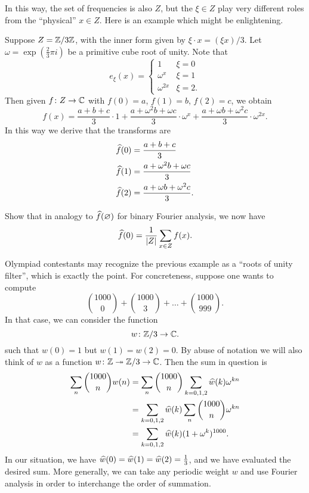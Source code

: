 In this way, the set of frequencies is also $Z$,
but the $\xi \in Z$ play very different roles from the ``physical'' $x \in Z$.
Here is an example which might be enlightening.
\begin{example}
	Suppose $Z = \mathbb Z/3\mathbb Z$, with the inner form given by $\xi \cdot x = (\xi x)/3$.
	Let $\omega = \exp(\frac 23 \pi i)$ be a primitive cube root of unity.
	Note that
	\[ e_\xi(x) = \begin{cases}
			1 & \xi = 0 \\
			\omega^x & \xi = 1 \\
			\omega^{2x} & \xi = 2.
		\end{cases} \]
	Then given $f \colon Z \to \mathbb C$ with $f(0) = a$, $f(1) = b$, $f(2) = c$,
	we obtain
	\[ f(x) = \frac{a+b+c}{3} \cdot 1
		+ \frac{a + \omega^2 b + \omega c}{3} \cdot \omega^x
		+ \frac{a + \omega b + \omega^2 c}{3} \cdot \omega^{2x}.  \]
	In this way we derive that the transforms are
	\begin{align*}
		\widehat f(0) &= \frac{a+b+c}{3} \\
		\widehat f(1) &= \frac{a+\omega^2 b+ \omega c}{3} \\
		\widehat f(2) &= \frac{a+\omega b+\omega^2c}{3}.
	\end{align*}
\end{example}
\begin{exercise}
	Show that in analogy to $\widehat f(\varnothing)$
	for binary Fourier analysis, we now have
	\[ \widehat f(0) = \frac{1}{|Z|} \sum_{x \in Z} f(x). \]
\end{exercise}
Olympiad contestants may recognize the previous example
as a ``roots of unity filter'', which is exactly the point.
For concreteness, suppose one wants to compute
\[ \binom{1000}{0} + \binom{1000}{3} + \dots + \binom{1000}{999}. \]
In that case, we can consider the function
\[ w \colon \mathbb Z/3 \to \mathbb C. \]
such that $w(0) = 1$ but $w(1) = w(2) = 0$.
By abuse of notation we will also think of $w$
as a function $w \colon \mathbb Z \twoheadrightarrow \mathbb Z/3 \to \mathbb C$.
Then the sum in question is
\begin{align*}
	\sum_n \binom{1000}{n} w(n)
	&= \sum_n \binom{1000}{n} \sum_{k=0,1,2} \widehat w(k) \omega^{kn} \\
	&= \sum_{k=0,1,2} \widehat w(k) \sum_n \binom{1000}{n} \omega^{kn} \\
	&= \sum_{k=0,1,2} \widehat w(k) (1+\omega^k)^{1000}.
\end{align*}
In our situation, we have $\widehat w(0) = \widehat w(1) = \widehat w(2) = \frac13$,
and we have evaluated the desired sum.
More generally, we can take any periodic weight $w$
and use Fourier analysis in order to interchange the order of summation.

